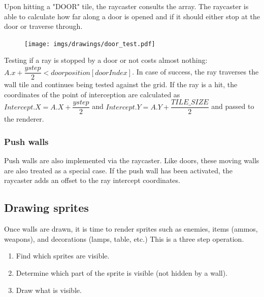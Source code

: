 \par
Upon hitting a "DOOR" tile, the raycaster consults the  array. The raycaster is able to calculate how far along a door is opened and if it should either stop at the door or traverse through.\\

\begin{minipage}{\textwidth}

\end{minipage}

\par 
 \par
\begin{figure}[H]
  \centering
 \texttt{[image: imgs/drawings/door\_test.pdf]}
\end{figure}
\par
Testing if a ray is stopped by a door or not costs almost nothing: $A.x + \dfrac{ystep}{2} < doorposition[doorIndex]$. In case of success, the ray traverses the wall tile and continues being tested against the grid. If the ray is a hit, the coordinates of the point of interception are calculated as $Intercept.X = A.X + \dfrac{ystep}{2}$ and $Intercept.Y = A.Y + \dfrac{TILE\_SIZE}{2}$ and passed to the renderer.












\subsubsection{Push walls} 
Push walls are also implemented via the raycaster. Like doors, these moving walls are also treated as a special case. If the push wall has been activated, the raycaster adds an offset to the ray intercept coordinates.

















\subsection{Drawing sprites}
Once walls are drawn, it is time to render sprites such as enemies, items (ammos, weapons), and decorations (lamps, table, etc.) This is a three step operation.
 \begin{enumerate}
  \item Find which sprites are visible.
  \item Determine which part of the sprite is visible (not hidden by a wall).
  \item Draw what is visible.
 \end{enumerate}



